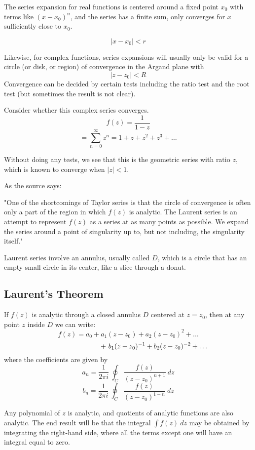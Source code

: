 \documentclass[11pt, oneside]{article}   	%
\begin{document}
The series expansion for real functions is centered around a fixed point $x_0$ with terms like $(x - x_0)^n$, and the series has a finite sum, only converges for $x$ sufficiently close to $x_0$.

\[ |x - x_0| < r \]

Likewise, for complex functions, series expansions will usually only be valid for a circle (or disk, or region) of convergence in the Argand plane with 
\[ | z - z_0 | < R \]
Convergence can be decided by certain tests including the ratio test and the root test (but sometimes the result is not clear).

Consider whether this complex series converges.  
\[ f(z) = \frac{1}{1 - z} \]
\[ =\sum_{n=0}^{\infty} z^n = 1 + z + z^2 + z^3 + \dots \]

Without doing any tests, we see that this is the geometric series with ratio $z$, which is known to converge when $|z| < 1$.

As the source says:  

"One of the shortcomings of Taylor series is that the circle of convergence is often only a part of the region in which $f(z)$ is analytic.  The Laurent series is an attempt to represent $f(z)$ as a series at as many points as possible. We expand the series around a point of singularity up to, but not including, the singularity itself."

Laurent series involve an annulus, usually called $D$, which is a circle that has an empty small circle in its center, like a slice through a donut.

\subsection*{Laurent's Theorem}
If $f(z)$ is analytic through a closed annulus $D$ centered at $z = z_0$, then at any point $z$ inside $D$ we can write:
\[ f(z) = a_0 + a_1(z-z_0) + a_2(z-z_0)^2 + \dots \]
\[ \hspace{27mm} + \ b_1(z-z_0)^{-1} + b_2(z-z_0)^{-2} + \dots \]
where the coefficients are given by
\[ a_n = \frac{1}{2 \pi i} \ \oint_C \frac{f(z)}{(z - z_0)^{n+1}} \ dz \]
\[ b_n = \frac{1}{2 \pi i} \ \oint_C \frac{f(z)}{(z - z_0)^{1-n}} \ dz \]

Any polynomial of $z$ is analytic, and quotients of analytic functions are also analytic.  The end result will be that the integral $\int f(z) \ dz$ may be obtained by integrating the right-hand side, where all the terms except one will have an integral equal to zero.
\end{document}
